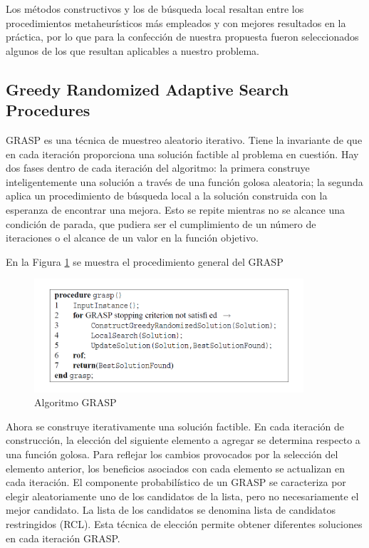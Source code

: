 \documentclass[a4paper,openright,11pt,oneside]{book}
\begin{document}
		Los métodos constructivos y los de búsqueda local resaltan entre los procedimientos metaheurísticos más empleados y con mejores resultados en la práctica, por lo que para la confección de nuestra propuesta fueron seleccionados algunos de los que resultan aplicables a nuestro problema. 
	
		\subsection{Greedy Randomized Adaptive Search Procedures} \label{sub:GRASP}
		GRASP \cite{GRASP} es una técnica de muestreo aleatorio iterativo. Tiene la invariante de que en cada iteración proporciona una solución factible al problema en cuestión. Hay dos fases dentro de cada iteración del algoritmo: la primera construye inteligentemente una solución a través de una función golosa aleatoria; la segunda aplica un procedimiento de búsqueda local a la solución construida con la esperanza de encontrar una mejora. Esto se repite mientras no se alcance una condición de parada, que pudiera ser el cumplimiento de un número de iteraciones o el alcance de un valor en la función objetivo.
		
		En la Figura \ref{GRASPgeneral} se muestra el procedimiento general del GRASP
		
		\begin{figure}[h]
			\centering
			\includegraphics[width=10cm]{./Graphics/GRASPgeneral.png}
			\caption{Algoritmo GRASP \cite{binato2001greedy}}
			\label{GRASPgeneral}
		\end{figure}
		
		Ahora se construye iterativamente una solución factible. En cada iteración de construcción, la elección del siguiente elemento a agregar se determina respecto a una función golosa. Para reflejar los cambios provocados por la selección del elemento anterior, los beneficios asociados con cada elemento se actualizan en cada iteración. El componente probabilístico de un GRASP se caracteriza por elegir aleatoriamente uno de los candidatos de la lista, pero no necesariamente el mejor candidato. La lista de los candidatos se denomina lista de candidatos restringidos (RCL). Esta técnica de elección permite obtener diferentes soluciones en cada iteración GRASP.
		
\end{document}
